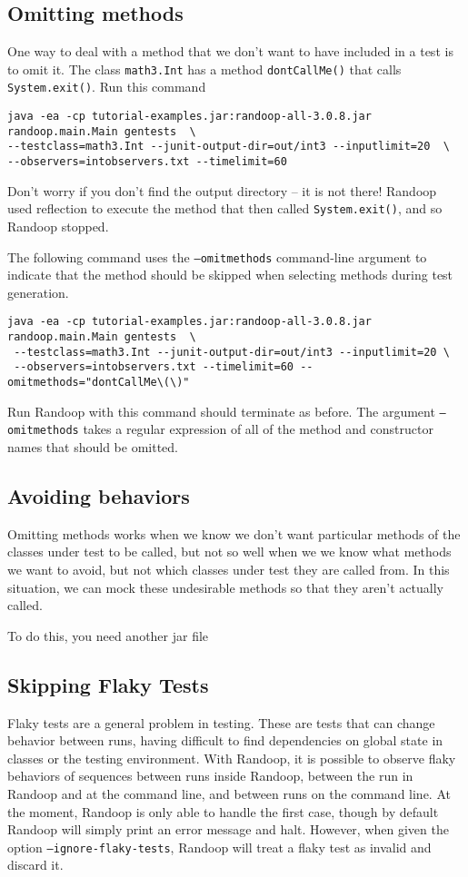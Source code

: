 \documentclass[11pt, oneside]{article} %
\newcommand{\code}[1]{{\texttt{#1}}}
\newcommand{\cmd}[1]{{\texttt{#1}}}
\begin{document}
\subsection{Omitting methods}
One way to deal with a method that we don't want to have included in a test is to omit it.
The class \code{math3.Int} has a method \code{dontCallMe()} that calls \code{System.exit()}.
Run this command 
\begin{verbatim}
java -ea -cp tutorial-examples.jar:randoop-all-3.0.8.jar randoop.main.Main gentests  \
--testclass=math3.Int --junit-output-dir=out/int3 --inputlimit=20  \
--observers=intobservers.txt --timelimit=60
\end{verbatim}
Don't worry if you don't find the output directory -- it is not there!
Randoop used reflection to execute the method that then called \code{System.exit()}, and so Randoop stopped.

The following command uses the \cmd{--omitmethods} command-line argument to indicate that the method should be skipped when selecting methods during test generation.
\begin{verbatim}
java -ea -cp tutorial-examples.jar:randoop-all-3.0.8.jar randoop.main.Main gentests  \
 --testclass=math3.Int --junit-output-dir=out/int3 --inputlimit=20 \
 --observers=intobservers.txt --timelimit=60 --omitmethods="dontCallMe\(\)"
\end{verbatim}
Run Randoop with this command should terminate as before.
The argument  \cmd{--omitmethods} takes a regular expression of all of the method and constructor names that should be omitted.

\subsection{Avoiding behaviors}
Omitting methods works when we know we don't want particular methods of the classes under test to be called, but not so well when we we know what methods we want to avoid, but not which classes under test they are called from.
In this situation, we can mock these undesirable methods so that they aren't actually called.

To do this, you need another jar file 





\subsection{Skipping Flaky Tests}
Flaky tests are a general problem in testing.
These are tests that can change behavior between runs, having difficult to find dependencies on global state in classes or the testing environment. 
With Randoop, it is possible to observe flaky behaviors of sequences between runs inside Randoop, between the run in Randoop and at the command line, and between runs on the command line.
At the moment, Randoop is only able to handle the first case, though by default Randoop will simply print an error message and halt.
However, when given the option \cmd{--ignore-flaky-tests}, Randoop will treat a flaky test as invalid and discard it.
\end{document}
